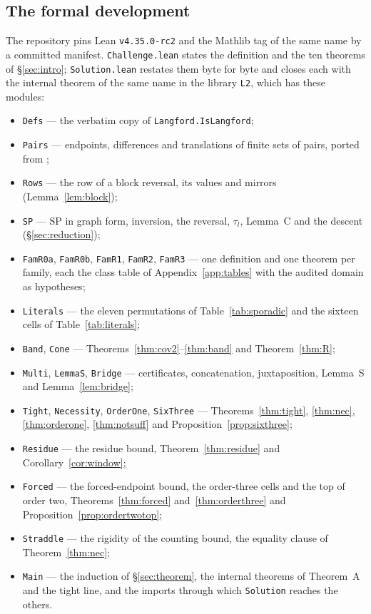 \documentclass[11pt]{amsart}
\theoremstyle{plain}
\theoremstyle{definition}
\theoremstyle{remark}
\newcommand{\SP}{\mathrm{SP}}
\begin{document}
\subsection*{The formal development}
The repository \cite{l2lean} pins Lean \texttt{v4.35.0-rc2} and the Mathlib tag of the
same name by a committed manifest. \texttt{Challenge.lean} states the definition and the
ten theorems of \S\ref{sec:intro}; \texttt{Solution.lean} restates them byte for byte and
closes each with the internal theorem of the same name in the library \texttt{L2}, which
has these modules:
\begin{itemize}\setlength{\itemsep}{0pt plus 1pt}
\item \texttt{Defs} --- the verbatim copy of \texttt{Langford.IsLangford};
\item \texttt{Pairs} --- endpoints, differences and translations of finite sets of
  pairs, ported from \cite{gnlean};
\item \texttt{Rows} --- the row of a block reversal, its values and mirrors
  (Lemma~\ref{lem:block});
\item \texttt{SP} --- $\SP$ in graph form, inversion, the reversal, $\tau_l$, Lemma~C
  and the descent (\S\ref{sec:reduction});
\item \texttt{FamR0a}, \texttt{FamR0b}, \texttt{FamR1}, \texttt{FamR2}, \texttt{FamR3}
  --- one definition and one theorem per family, each the class table of
  Appendix~\ref{app:tables} with the audited domain as hypotheses;
\item \texttt{Literals} --- the eleven permutations of Table~\ref{tab:sporadic} and the
  sixteen cells of Table~\ref{tab:literals};
\item \texttt{Band}, \texttt{Cone} --- Theorems~\ref{thm:cov2}--\ref{thm:band} and
  Theorem~\ref{thm:R};
\item \texttt{Multi}, \texttt{LemmaS}, \texttt{Bridge} --- certificates, concatenation,
  juxtaposition, Lemma~S and Lemma~\ref{lem:bridge};
\item \texttt{Tight}, \texttt{Necessity}, \texttt{OrderOne}, \texttt{SixThree} ---
  Theorems~\ref{thm:tight}, \ref{thm:nec}, \ref{thm:orderone}, \ref{thm:notsuff} and
  Proposition~\ref{prop:sixthree};
\item \texttt{Residue} --- the residue bound, Theorem~\ref{thm:residue} and
  Corollary~\ref{cor:window};
\item \texttt{Forced} --- the forced-endpoint bound, the order-three cells and the top
  of order two, Theorems~\ref{thm:forced} and~\ref{thm:orderthree} and
  Proposition~\ref{prop:ordertwotop};
\item \texttt{Straddle} --- the rigidity of the counting bound, the equality clause of
  Theorem~\ref{thm:nec};
\item \texttt{Main} --- the induction of \S\ref{sec:theorem}, the internal theorems of Theorem~A and
  the tight line, and the imports through which \texttt{Solution} reaches the others.
\end{itemize}
\end{document}
